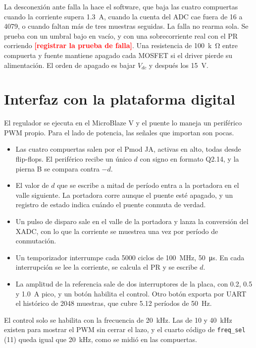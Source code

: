 \documentclass[journal]{IEEEtran}
\newcommand{\pendiente}[1]{\textcolor{red}{\textbf{[#1]}}}
\begin{document}
La desconexión ante falla la hace el software, que baja las cuatro compuertas cuando la corriente supera \SI{1.3}{A}, cuando la cuenta del ADC cae fuera de \num{16} a \num{4079}, o cuando faltan más de tres muestras seguidas. La falla no rearma sola. Se prueba con un umbral bajo en vacío, y con una sobrecorriente real con el PR corriendo \pendiente{registrar la prueba de falla}. Una resistencia de \SI{100}{k\ohm} entre compuerta y fuente mantiene apagado cada MOSFET si el driver pierde su alimentación. El orden de apagado es bajar $V_{dc}$ y después los \SI{15}{V}.

\section{Interfaz con la plataforma digital}
\label{sec:interfaz}
El regulador se ejecuta en el MicroBlaze V y el puente lo maneja un periférico PWM propio. Para el lado de potencia, las señales que importan son pocas.

\begin{itemize}
	\item Las cuatro compuertas salen por el Pmod JA, activas en alto, todas desde flip-flops. El periférico recibe un único $d$ con signo en formato Q2.14, y la pierna B se compara contra $-d$.
	\item El valor de $d$ que se escribe a mitad de período entra a la portadora en el valle siguiente. La portadora corre aunque el puente esté apagado, y un registro de estado indica cuándo el puente conmuta de verdad.
	\item Un pulso de disparo sale en el valle de la portadora y lanza la conversión del XADC, con lo que la corriente se muestrea una vez por período de conmutación.
	\item Un temporizador interrumpe cada \num{5000} ciclos de \SI{100}{MHz}, \SI{50}{\micro s}. En cada interrupción se lee la corriente, se calcula el PR y se escribe $d$.
	\item La amplitud de la referencia sale de dos interruptores de la placa, con \num{0.2}, \num{0.5} y \SI{1.0}{A} pico, y un botón habilita el control. Otro botón exporta por UART el histórico de \num{2048} muestras, que cubre \num{5.12} períodos de \SI{50}{Hz}.
\end{itemize}

El control solo se habilita con la frecuencia de \SI{20}{kHz}. Las de \num{10} y \SI{40}{kHz} existen para mostrar el PWM sin cerrar el lazo, y el cuarto código de \texttt{freq\_sel} (11) queda igual que \SI{20}{kHz}, como se midió en las compuertas.
\end{document}
